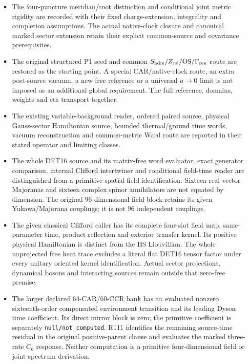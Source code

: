 \begin{itemize}[leftmargin=2em,itemsep=3pt]
\item The four-puncture meridian/root distinction and conditional joint
metric rigidity are recorded with their fixed charge-extension,
integrality and completion assumptions. The actual native-clock
closure and canonical marked sector extension retain their explicit
common-source and covariance prerequisites.
\item The original structured P1 seed and common
$S_{\rm adm}/Z_{\rm rel}/\mathrm{OS}/\Gamma_{\rm ren}$ route are
restored as the starting point. A special CAR/native-clock route,
an extra post-source vacuum, a new free reference or a universal
$a\to0$ limit is not imposed as an additional global requirement.
The full reference, domains, weights and eta transport together.
\item The existing variable-background reader, ordered paired source,
physical Gauss-sector Hamiltonian source, bounded thermal/ground
time words, vacuum reconstruction and common-metric Ward route are
reported in their stated operator and limiting classes.
\item The whole DET16 source and its matrix-free word evaluator,
exact generator comparison, internal Clifford intertwiner and
conditional field-time reader are distinguished from a primitive
spatial field identification. Sixteen real vector Majoranas and
sixteen complex spinor annihilators are not equated by dimension.
The original $96$-dimensional field block retains its given
Yukawa/Majorana couplings; it is not $96$ independent couplings.
\item The given classical Clifford caller has its complete four-slot
field map, same-parameter time, product reflection and exterior
transfer kernel. Its positive physical Hamiltonian is distinct from
the HS Liouvillian. The whole unprojected free heat trace excludes a
literal flat DET16 tensor factor under every unitary oriented kernel
identification. Actual sector projections, dynamical bosons and
interacting sources remain outside that zero-free premise.
\item The larger declared $64$-CAR/$60$-CCR bank has an evaluated
nonzero sixteenth-order compensated environment transition and its
leading Dyson time coefficient. Its direct mirror block is zero;
the primitive coefficient is separately \texttt{null/not\_computed}.
R111 identifies the remaining source-time residual in the original
positive-parent clause and evaluates the marked three-rate $C_6$
response. Neither computation is a primitive four-dimensional
field or joint-spectrum derivation.
\end{itemize}

